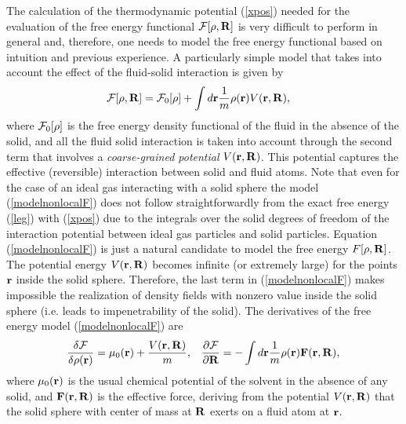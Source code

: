 \documentclass[b5paper,openright,10pt]{book}
\begin{document}
The calculation of the thermodynamic potential (\ref{xpos}) needed for
the evaluation of the free  energy functional ${\cal F}[\rho,{\bf R}]$
is very difficult  to perform in general and,  therefore, one needs to  model the
free energy functional based on intuition and previous experience. A
particularly simple model that takes into account the effect of the
fluid-solid interaction is given by
\begin{align}
  {\cal F}[\rho,{\bf R}]&={\cal F}_0[\rho]
+\int d{\bf r}\frac{1}{m}
\rho({\bf r})V({\bf r},{\bf R}),
\label{modelnonlocalF}
\end{align}
where ${\cal F}_0[\rho]$ is the  free energy density functional of the
fluid in the absence of the solid, and all the fluid solid interaction
is  taken  into  account  through  the second  term  that  involves  a
\textit{coarse-grained   potential}   $V({\bf  r},{\bf   R})$.    This
potential  captures  the  effective (reversible)  interaction  between
solid and fluid atoms.  Note  that even for the case of
  an   ideal  gas   interacting  with   a  solid   sphere  the   model
  (\ref{modelnonlocalF})  does not  follow  straightforwardly from  the
  exact free energy (\ref{leg}) with (\ref{xpos}) due to the integrals
  over  the solid  degrees  of freedom  of  the interaction  potential
  between    ideal     gas    particles    and     solid    particles.
  Equation (\ref{modelnonlocalF}) is just a natural  candidate to model the free
  energy $F[\rho,{\bf R}]$. The potential energy $V({\bf r},{\bf R})$
becomes infinite (or extremely large)  for the points ${\bf r}$ inside
the solid  sphere. Therefore, the last  term in (\ref{modelnonlocalF})
makes impossible the realization of density fields with nonzero value
inside the solid sphere (i.e.  leads to impenetrability of the solid).
The derivatives of the free energy model (\ref{modelnonlocalF}) are
\begin{align}
  \frac{\delta{\cal F}}{\delta\rho({\bf r})}=\mu_0({\bf r})+\frac{V({\bf r},{\bf R})}{m},&&
  \frac{\partial{\cal F}}{\partial{\bf R}}=-\int d{\bf r}\frac{1}{m}\rho({\bf r}){\bf F}({\bf r},{\bf R}),
\end{align}
where $\mu_0({\bf r})$ is the  usual chemical potential of the solvent
in the  absence of any  solid, and ${\bf  F}({\bf r},{\bf R})$  is the
effective force, deriving from the potential $V({\bf r},{\bf R})$ that
the solid sphere  with center of mass  at ${\bf R}$ exerts  on a fluid
atom at ${\bf r}$.
\end{document}
